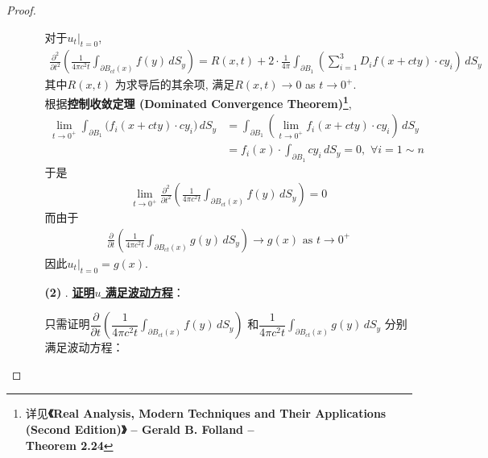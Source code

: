 \begin{thm}
\begin{proof}
\begin{enumerate}
\begin{enumerate}
					对于$u_t \Big|_{t = 0}$, 
					\begin{align*}
						\frac{\partial^2}{\partial t^2} \left( \frac{1}{4\pi c^2 t} \int_{\partial B_{ct}(x)} f(y) \, dS_y \right) 
						= R(x , t) + 2 \cdot \frac{1}{4 \pi} \int_{\partial B_{1}} \left( \sum_{i = 1}^3 D_{i} f(x + cty) \cdot c y_i \right) \, dS_y
					\end{align*}
					其中$R(x , t)$ 为求导后的其余项, 满足$R(x , t) \to 0$ as $t \to 0^+$. \\
					根据\textbf{控制收敛定理 (Dominated Convergence Theorem)\footnote{详见\textbf{《Real Analysis, Modern Techniques and Their Applications (Second Edition)》 -- Gerald B. Folland -- \\
								Theorem 2.24}}}, 
					\begin{align*}
						\lim_{t \to 0^+} \int_{\partial B_1} \Big( f_i(x + cty) \cdot c y_i \Big) \, dS_y 
						&= \int_{\partial B_1} \left( \lim_{t \to 0^+} f_i(x + cty) \cdot c y_i \right) \, dS_y \\
						&= f_i(x) \cdot \int_{\partial B_1} c y_i \, dS_y 
						= 0 , \,\, \forall i = 1 \sim n
					\end{align*}
					于是
					\begin{align*}
						\lim_{t \to 0^+} \frac{\partial^2}{\partial t^2} \left( \frac{1}{4\pi c^2 t} \int_{\partial B_{ct}(x)} f(y) \, dS_y \right) 
						= 0
					\end{align*}
					而由于
					\begin{align*}
						\frac{\partial}{\partial t} \left( \frac{1}{4\pi c^2 t} \int_{\partial B_{ct}(x)} g(y) \, dS_y \right) 
						\to g(x) \,\, \text{as} \,\, t \to 0^+
					\end{align*}
					因此$u_t \Big|_{t = 0} = g(x)$. 
					
					\vspace*{4em}
					
					\item[\textbf{(2)}]. \underline{\textbf{证明$u$ 满足波动方程}}：
					
					\vspace*{1em}
					
					只需证明$\dfrac{\partial}{\partial t} \left( \dfrac{1}{4\pi c^2 t} \int_{\partial B_{ct}(x)} f(y) \, dS_y \right)$ 和$\dfrac{1}{4\pi c^2 t} \int_{\partial B_{ct}(x)} g(y) \, dS_y$ 分别满足波动方程：
					
					\vspace*{1em}
					

\end{enumerate}
\end{enumerate}
\end{proof}
\end{thm}
